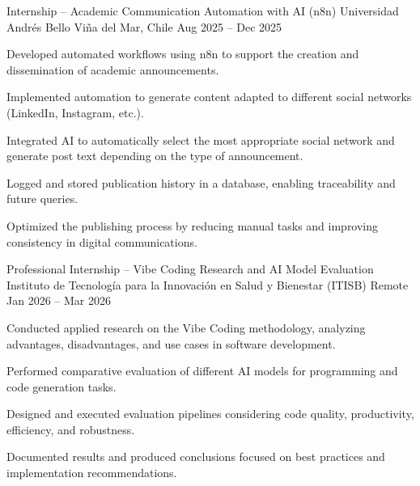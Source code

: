 
\begin{cventries}

\cventry
  {Internship – Academic Communication Automation with AI (n8n)}
  {Universidad Andrés Bello}
  {Viña del Mar, Chile}
  {Aug 2025 – Dec 2025}
  {
    \begin{cvitems}
      \item {Developed automated workflows using n8n to support the creation and dissemination of academic announcements.}
      \item {Implemented automation to generate content adapted to different social networks (LinkedIn, Instagram, etc.).}
      \item {Integrated AI to automatically select the most appropriate social network and generate post text depending on the type of announcement.}
      \item {Logged and stored publication history in a database, enabling traceability and future queries.}
      \item {Optimized the publishing process by reducing manual tasks and improving consistency in digital communications.}
    \end{cvitems}
    \vspace{5mm}
  }

\cventry
  {Professional Internship – Vibe Coding Research and AI Model Evaluation}
  {Instituto de Tecnología para la Innovación en Salud y Bienestar (ITISB)}
  {Remote}
  {Jan 2026 – Mar 2026}
  {
    \begin{cvitems}
      \item {Conducted applied research on the Vibe Coding methodology, analyzing advantages, disadvantages, and use cases in software development.}
      \item {Performed comparative evaluation of different AI models for programming and code generation tasks.}
      \item {Designed and executed evaluation pipelines considering code quality, productivity, efficiency, and robustness.}
      \item {Documented results and produced conclusions focused on best practices and implementation recommendations.}
    \end{cvitems}
    \vspace{5mm}
  }
\end{cventries}